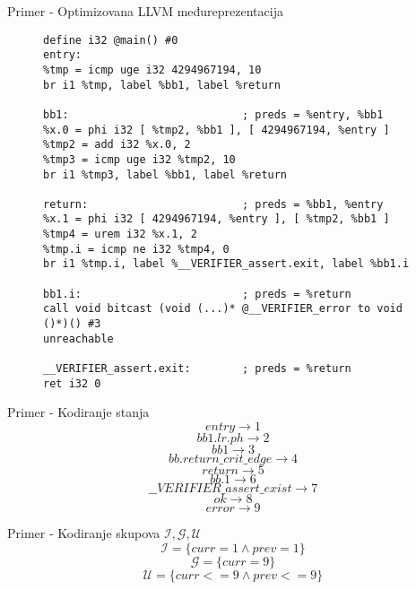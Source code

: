 \documentclass{beamer}
\begin{document}
\begin{frame}[fragile]{Primer - Optimizovana LLVM međureprezentacija}
    \begin{figure}[!h]
        \centering
\begin{lstlisting}[basicstyle=\tiny]
define i32 @main() #0
entry:
%tmp = icmp uge i32 4294967194, 10
br i1 %tmp, label %bb1, label %return

bb1:                           ; preds = %entry, %bb1
%x.0 = phi i32 [ %tmp2, %bb1 ], [ 4294967194, %entry ]
%tmp2 = add i32 %x.0, 2
%tmp3 = icmp uge i32 %tmp2, 10
br i1 %tmp3, label %bb1, label %return

return:                        ; preds = %bb1, %entry
%x.1 = phi i32 [ 4294967194, %entry ], [ %tmp2, %bb1 ]
%tmp4 = urem i32 %x.1, 2
%tmp.i = icmp ne i32 %tmp4, 0
br i1 %tmp.i, label %__VERIFIER_assert.exit, label %bb1.i

bb1.i:                         ; preds = %return
call void bitcast (void (...)* @__VERIFIER_error to void ()*)() #3
unreachable

__VERIFIER_assert.exit:        ; preds = %return
ret i32 0
\end{lstlisting}
    \end{figure}
\end{frame}

\begin{frame}{Primer - Kodiranje stanja}
    $$entry \rightarrow 1$$
    $$bb1.lr.ph \rightarrow 2$$
    $$bb1 \rightarrow 3$$
    $$bb.return\_crit\_edge \rightarrow 4$$
    $$return \rightarrow 5$$
    $$bb.1 \rightarrow 6$$
    $$\_\_VERIFIER\_assert\_exist \rightarrow 7$$
    $$ok \rightarrow 8$$
    $$error \rightarrow 9$$
\end{frame}

\begin{frame}{Primer - Kodiranje skupova $\mathcal{I}, \mathcal{G}, \mathcal{U}$}
$$\mathcal{I} = \{ curr = 1 \wedge prev = 1 \}$$
$$\mathcal{G} = \{ curr = 9 \}$$
$$\mathcal{U} = \{ curr <= 9 \wedge prev <= 9 \}$$
\end{frame}
\end{document}
